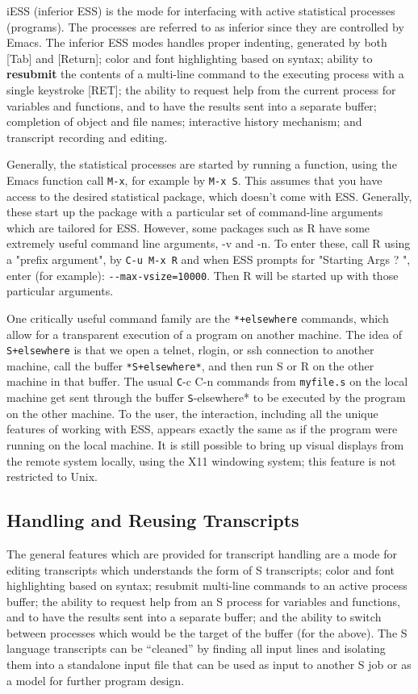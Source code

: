 \documentclass{article}
\begin{document}
iESS (inferior ESS) is the mode for interfacing with active
statistical processes (programs).  The processes are referred to as
inferior since they are controlled by Emacs.  The inferior ESS modes
handles proper indenting, generated by both [Tab] and [Return]; color
and font highlighting based on syntax; ability to \textbf{resubmit}
the contents of a multi-line command to the executing process with a
single keystroke [RET]; the ability to request help from the current
process for variables and functions, and to have the results sent into
a separate buffer; completion of object and file names; interactive
history mechanism; and transcript recording and editing.

Generally, the statistical processes are started by running a
function, using the Emacs function call \verb+M-x+, for example by
\verb|M-x S|.  This assumes that you have access to the desired
statistical package, which doesn't come with ESS.  Generally, these
start up the package with a particular set of command-line arguments
which are tailored for ESS.  However, some packages such as R have
some extremely useful command line arguments, -v and -n.  To enter
these, call R using a "prefix argument", by \verb+C-u M-x R+ and when
ESS prompts for "Starting Args ? ", enter (for example):
\verb+--max-vsize=10000+.  Then R will be started up with those
particular arguments.

One critically useful command family are the \verb|*+elsewhere|
commands, which allow for a transparent execution of a program on
another machine.  The idea of \verb|S+elsewhere| is that we open a
telnet, rlogin, or ssh connection to another machine, call the buffer
\verb|*S+elsewhere*|, and then run S or R on the other machine in that
buffer.  The usual {\texttt C-c C-n} commands from
{\small\texttt{myfile.s}} on the local machine get sent through the
buffer {\texttt *S-elsewhere*} to be executed by the program on the
other machine.  To the user, the interaction, including all the unique
features of working with ESS, appears exactly the same as if the
program were running on the local machine.  It is still possible to
bring up visual displays from the remote system locally, using the X11
windowing system; this feature is not restricted to Unix.

\subsection{Handling and Reusing Transcripts}
\label{sec:S:trans}

The general features which are provided for transcript handling are a
mode for editing transcripts which understands the form of S
transcripts; color and font highlighting based on syntax; resubmit
multi-line commands to an active process buffer; the ability to
request help from an S process for variables and functions, and to
have the results sent into a separate buffer; and the ability to
switch between processes which would be the target of the buffer (for
the above).  The S language transcripts can be ``cleaned'' by
finding all input lines and isolating them into a standalone input file
that can be used as input to another S job or as a model for further
program design.
\end{document}
